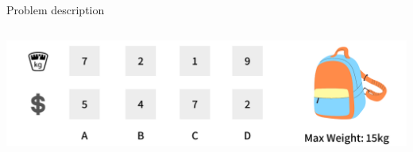 \documentclass[aspectratio=169]{beamer}
\begin{document}
\begin{frame}{Problem description}
{\begin{columns}
                \begin{column}{0.45\textwidth}
                    \begin{center}
                        \includegraphics[scale=0.15]{img/knapsack.png}
                    \end{center}
                \end{column}
            \end{columns}   
        }
        
\end{frame}
\end{document}
